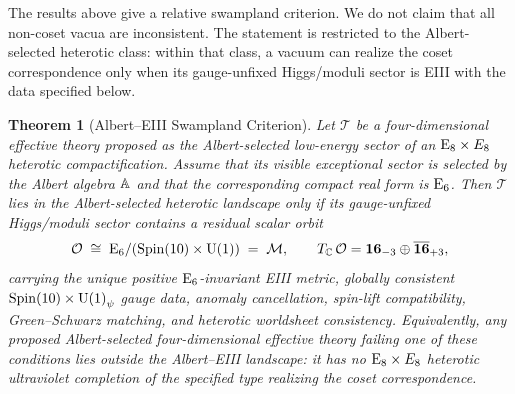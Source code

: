 \documentclass[pdflatex,sn-mathphys-num]{sn-jnl}
\theoremstyle{thmstyleone}
\newtheorem{theorem}{Theorem}
\theoremstyle{thmstylethree}%
\theoremstyle{thmstyletwo}%
\begin{document}
The results above give a relative swampland criterion. We do not claim
that all non-coset vacua are inconsistent. The statement is restricted to the
Albert-selected heterotic class: within that class, a vacuum can realize the
coset correspondence only when its gauge-unfixed Higgs/moduli sector is EIII with
the data specified below.

\begin{theorem}[Albert--EIII Swampland Criterion]
\label{thm:Swampland}
Let $\mathcal T$ be a four-dimensional effective theory proposed as the
Albert-selected low-energy sector of an $\mathrm{E}_{8}\times E_{8}$ heterotic
compactification.  Assume that its visible exceptional sector is selected by the
Albert algebra $\mathbb{A}$ and that the corresponding compact real form is $\mathrm{E}_{6}$.
Then $\mathcal T$ lies in the Albert-selected heterotic landscape only if its
gauge-unfixed Higgs/moduli sector contains a residual scalar orbit
\[
  \mathcal O\;\cong\;\mathrm{E}_{6}/(\operatorname{Spin}(10) \times \mathrm{U(1)})\;=\;\mathcal{M},
  \qquad
  T_{\mathbb C}\,\mathcal O
  =
  \mathbf{16}_{-3}\oplus\overline{\mathbf{16}}_{+3},
\]
carrying the unique positive $\mathrm{E}_{6}$-invariant EIII metric, globally consistent
$\operatorname{Spin}(10) \times \mathrm{U(1)}_\psi$ gauge data, anomaly cancellation, spin-lift compatibility,
Green--Schwarz matching, and heterotic worldsheet consistency.  Equivalently, any
proposed Albert-selected four-dimensional effective theory failing one of these
conditions lies outside the Albert--EIII landscape: it has no
$\mathrm{E}_{8}\times E_{8}$ heterotic ultraviolet completion of the specified type
realizing the coset correspondence.
\end{theorem}
\end{document}
